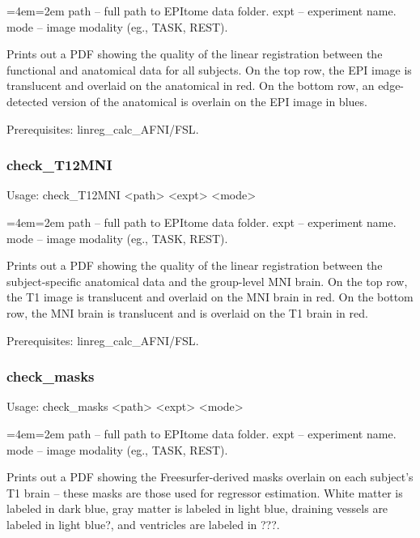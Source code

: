 \documentclass[final,titlepage,letterpaper,oneside,12pt]{article}
\renewcommand{\texttt}[2][BrickRed]{\textcolor{#1}{\ttfamily #2}}%
\newenvironment{blockquote}{%
  \par%
  \medskip
  \leftskip=4em\rightskip=2em%
  \noindent\ignorespaces}{%
  \par\medskip}
\begin{document}
\begin{blockquote}
path -- full path to EPItome data folder.
expt -- experiment name.
mode -- image modality (eg., TASK, REST).
\end{blockquote}

\noindent Prints out a PDF showing the quality of the linear registration between the functional and anatomical data for all subjects. On the top row, the EPI image is translucent and overlaid on the anatomical in red. On the bottom row, an edge-detected version of the anatomical is overlain on the EPI image in blues.

Prerequisites: \texttt{linreg\_calc\_AFNI/FSL}.

\subsubsection{check\_T12MNI}
Usage: \texttt{check\_T12MNI <path> <expt> <mode>}

\begin{blockquote}
path -- full path to EPItome data folder.
expt -- experiment name.
mode -- image modality (eg., TASK, REST).
\end{blockquote}

\noindent Prints out a PDF showing the quality of the linear registration between the subject-specific anatomical data and the group-level MNI brain. On the top row, the T1 image is translucent and overlaid on the MNI brain in red. On the bottom row, the MNI brain is translucent and is overlaid on the T1 brain in red.

Prerequisites: \texttt{linreg\_calc\_AFNI/FSL}.

\subsubsection{check\_masks}
Usage: \texttt{check\_masks <path> <expt> <mode>}

\begin{blockquote}
path -- full path to EPItome data folder.
expt -- experiment name.
mode -- image modality (eg., TASK, REST).
\end{blockquote}

\noindent Prints out a PDF showing the Freesurfer-derived masks overlain on each subject's T1 brain -- these masks are those used for regressor estimation. White matter is labeled in dark blue, gray matter is labeled in light blue, draining vessels are labeled in light blue?, and ventricles are labeled in ???.  
\end{document}
